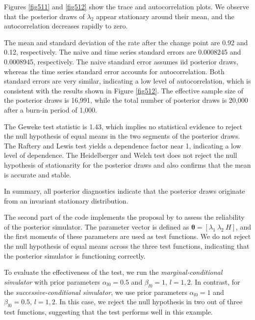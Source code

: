 Figures \ref{fig511} and \ref{fig512} show the trace and autocorrelation plots. We observe that the posterior draws of $\lambda_2$ appear stationary around their mean, and the autocorrelation decreases rapidly to zero.

The mean and standard deviation of the rate after the change point are 0.92 and 0.12, respectively. The naive and time series standard errors are 0.0008245 and 0.0008945, respectively. The naive standard error assumes iid posterior draws, whereas the time series standard error accounts for autocorrelation. Both standard errors are very similar, indicating a low level of autocorrelation, which is consistent with the results shown in Figure \ref{fig512}. The effective sample size of the posterior draws is 16,991, while the total number of posterior draws is 20,000 after a burn-in period of 1,000.

The Geweke test statistic is 1.43, which implies no statistical evidence to reject the null hypothesis of equal means in the two segments of the posterior draws. The Raftery and Lewis test yields a dependence factor near 1, indicating a low level of dependence. The Heidelberger and Welch test does not reject the null hypothesis of stationarity for the posterior draws and also confirms that the mean is accurate and stable.

In summary, all posterior diagnostics indicate that the posterior draws originate from an invariant stationary distribution.

The second part of the code implements the proposal by \cite{geweke2004getting} to assess the reliability of the posterior simulator. The parameter vector is defined as $\bm{\theta} = [\lambda_1 \ \lambda_2 \ H]$, and the first moments of these parameters are used as test functions. We do not reject the null hypothesis of equal means across the three test functions, indicating that the posterior simulator is functioning correctly.

To evaluate the effectiveness of the test, we run the \textit{marginal-conditional simulator} with prior parameters $\alpha_{l0} = 0.5$ and $\beta_{l0} = 1$, $l = 1, 2$. In contrast, for the \textit{successive-conditional simulator}, we use prior parameters $\alpha_{l0} = 1$ and $\beta_{l0} = 0.5$, $l = 1, 2$. In this case, we reject the null hypothesis in two out of three test functions, suggesting that the test performs well in this example.

